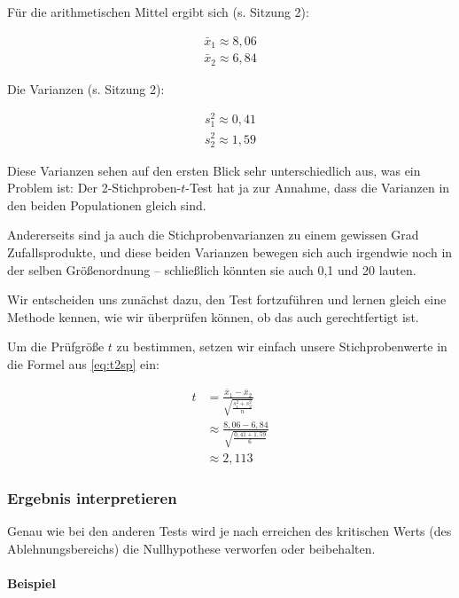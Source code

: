 \documentclass[
  ngerman,
]{article}
\begin{document}
Für die arithmetischen Mittel ergibt sich (s. Sitzung 2):

\[\begin{aligned}
\bar{x}_1\approx8{,}06\\[4pt]
\bar{x}_2\approx6{,}84
\end{aligned}\]

Die Varianzen (s. Sitzung 2):

\[\begin{aligned}
s^2_1\approx0{,}41\\[4pt]
s^2_2\approx1{,}59
\end{aligned}\]

Diese Varianzen sehen auf den ersten Blick sehr unterschiedlich aus, was ein Problem ist: Der 2-Stichproben-\(t\)-Test hat ja zur Annahme, dass die Varianzen in den beiden Populationen gleich sind.

Andererseits sind ja auch die Stichprobenvarianzen zu einem gewissen Grad Zufallsprodukte, und diese beiden Varianzen bewegen sich auch irgendwie noch in der selben Größenordnung -- schließlich könnten sie auch 0,1 und 20 lauten.

Wir entscheiden uns zunächst dazu, den Test fortzuführen und lernen gleich eine Methode kennen, wie wir überprüfen können, ob das auch gerechtfertigt ist.

Um die Prüfgröße \(t\) zu bestimmen, setzen wir einfach unsere Stichprobenwerte in die Formel aus \autoref{eq:t2sp} ein:

\[\begin{aligned}
t&=\frac{\bar{x}_1-\bar{x}_2}{\sqrt{\frac{s^2_1+s^2_2}{n}}}\\[6pt]
&\approx\frac{8{,}06-6{,}84}{\sqrt{\frac{0{,}41+1{,}59}{6}}}\\[4pt]
&\approx2{,}113
\end{aligned}\]

\hypertarget{ergebnis-interpretieren-1}{%
\subsubsection{Ergebnis interpretieren}\label{ergebnis-interpretieren-1}}

Genau wie bei den anderen Tests wird je nach erreichen des kritischen Werts (des Ablehnungsbereichs) die Nullhypothese verworfen oder beibehalten.

\hypertarget{beispiel-16}{%
\paragraph{Beispiel}\label{beispiel-16}}
\end{document}
